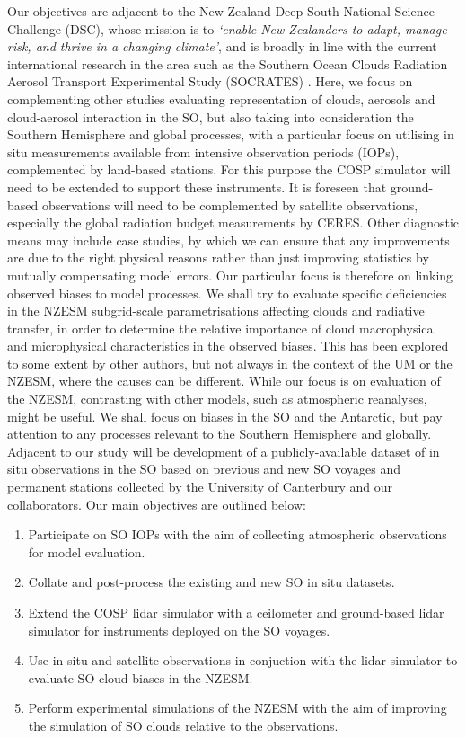 Our objectives are adjacent to the New Zealand Deep South National
Science Challenge (DSC), whose mission is to \textit{`enable New Zealanders to adapt,
manage risk, and thrive in a changing climate'}, and is
broadly in line with the current international research in the area
such as the Southern Ocean Clouds
Radiation Aerosol Transport Experimental Study (SOCRATES) \citep{mcfarquhar2014}.
Here, we focus on complementing other studies evaluating
representation of clouds, aerosols and cloud-aerosol interaction in the SO,
but also taking into consideration the Southern Hemisphere and global processes,
with a particular focus on utilising in situ measurements
available from intensive observation periods (IOPs), complemented by land-based
stations. For this
purpose the COSP simulator will need to be extended to support these
instruments. It is foreseen that ground-based observations will need to be
complemented by satellite observations, especially the global radiation budget
measurements by CERES.
Other diagnostic means may include
case studies, by which we can ensure that any improvements are due to
the right physical reasons rather than just improving statistics by mutually
compensating model errors. Our particular focus is therefore on linking
observed biases to model processes. 
We shall try to evaluate specific deficiencies in the NZESM subgrid-scale
parametrisations affecting clouds and radiative transfer, in order to
determine the relative importance of cloud macrophysical and microphysical
characteristics in the observed biases. This has been explored to some extent
by other authors, but not always in the context of the UM or the NZESM,
where the causes can be different.
While our focus is on evaluation of the NZESM, contrasting with other
models, such as atmospheric reanalyses, might be useful.
We shall focus on biases in the SO and the
Antarctic, but pay attention to any processes relevant to the Southern
Hemisphere and globally.
Adjacent to our study will be development of a publicly-available dataset
of in situ observations in the SO based on previous and new SO voyages
and permanent stations collected by the University of Canterbury and our
collaborators.
Our main objectives are outlined below:

\begin{enumerate}
\item Participate on SO IOPs
with the aim of collecting atmospheric observations for model evaluation.
\item Collate and post-process the existing and new SO in situ datasets.
\item Extend the COSP lidar simulator with a ceilometer and ground-based lidar
simulator for instruments deployed on the SO voyages.
\item Use in situ and satellite observations in conjuction with the lidar simulator
to evaluate SO cloud biases in the NZESM.
\item Perform experimental simulations of the NZESM with the aim of
improving the simulation of SO clouds relative to the observations.
\end{enumerate}

